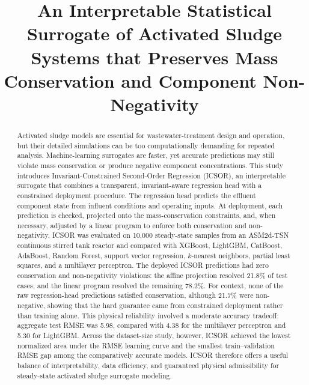 \documentclass[a4paper,fleqn]{cas-sc}
\DeclareRobustCommand{\currentrev}[1]{{\color{currentRevisionBlue}#1}}
\DeclareRobustCommand{\currentrev}[1]{#1}
\newcommand{\rev}[1]{#1}
\begin{document}
\let\WriteBookmarks\relax
\def\floatpagepagefraction{1}
\def\textpagefraction{.001}

\shortauthors{}

\title[mode=title]{\rev{An Interpretable Statistical Surrogate of Activated Sludge Systems that Preserves Mass Conservation and Component Non-Negativity}}

\author{}

\begin{abstract}
\rev{\currentrev{Activated sludge models are essential for wastewater-treatment design and operation, but their detailed simulations can be too computationally demanding for repeated analysis. Machine-learning surrogates are faster, yet accurate predictions may still violate mass conservation or produce negative component concentrations. This study introduces Invariant-Constrained Second-Order Regression (ICSOR), an interpretable surrogate that combines a transparent, invariant-aware regression head with a constrained deployment procedure. The regression head predicts the effluent component state from influent conditions and operating inputs. At deployment, each prediction is checked, projected onto the mass-conservation constraints, and, when necessary, adjusted by a linear program to enforce both conservation and non-negativity. ICSOR was evaluated on 10,000 steady-state samples from an ASM2d-TSN continuous stirred tank reactor and compared with XGBoost, LightGBM, CatBoost, AdaBoost, Random Forest, support vector regression, $k$-nearest neighbors, partial least squares, and a multilayer perceptron. The deployed ICSOR predictions had zero conservation and non-negativity violations: the affine projection resolved 21.8\% of test cases, and the linear program resolved the remaining 78.2\%. For context, none of the raw regression-head predictions satisfied conservation, although 21.7\% were non-negative, showing that the hard guarantee came from constrained deployment rather than training alone. This physical reliability involved a moderate accuracy tradeoff: aggregate test RMSE was 5.98, compared with 4.38 for the multilayer perceptron and 5.30 for LightGBM. Across the dataset-size study, however, ICSOR achieved the lowest normalized area under the RMSE learning curve and the smallest train--validation RMSE gap among the comparatively accurate models. ICSOR therefore offers a useful balance of interpretability, data efficiency, and guaranteed physical admissibility for steady-state activated sludge surrogate modeling.}}
\end{abstract}
\end{document}
